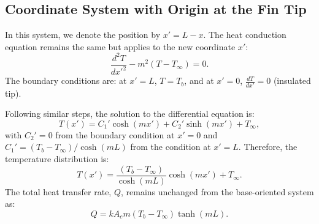 \documentclass{article}
\begin{document}
\subsection*{Coordinate System with Origin at the Fin Tip}
In this system, we denote the position by $x' = L - x$. The heat conduction equation remains the same but applies to the new coordinate $x'$:
\[
\frac{d^2T}{dx'^2} - m^2(T - T_\infty) = 0.
\]
The boundary conditions are: at $x' = L$, $T = T_b$, and at $x' = 0$, $\frac{dT}{dx'} = 0$ (insulated tip).

Following similar steps, the solution to the differential equation is:
\[
T(x') = C_1' \cosh(mx') + C_2' \sinh(mx') + T_\infty,
\]
with $C_2' = 0$ from the boundary condition at $x' = 0$ and $C_1' = (T_b - T_\infty) / \cosh(mL)$ from the condition at $x' = L$.
Therefore, the temperature distribution is:
\[
T(x') = \frac{(T_b - T_\infty)}{\cosh(mL)} \cosh(mx') + T_\infty.
\]
The total heat transfer rate, $Q$, remains unchanged from the base-oriented system as:
\[
Q = kA_c m (T_b - T_\infty) \tanh(mL).
\]
\end{document}

